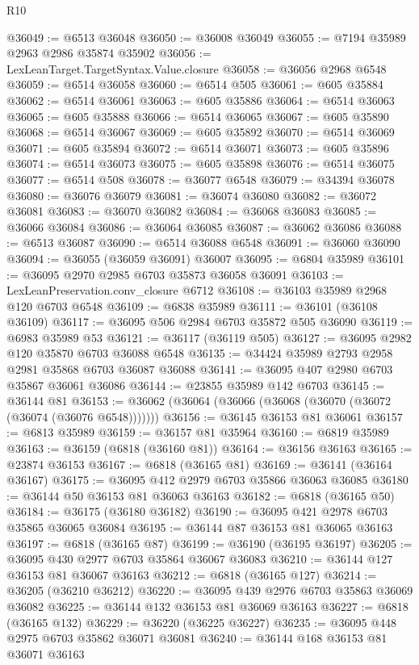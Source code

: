 \begin{lexlean}{R10}
\begin{coremodule}
@36049 := @6513 @36048
@36050 := @36008 @36049
@36055 := @7194 @35989 @2963 @2986 @35874 @35902
@36056 := LexLeanTarget.TargetSyntax.Value.closure
@36058 := @36056 @2968 @6548
@36059 := @6514 @36058
@36060 := @6514 @505
@36061 := @605 @35884
@36062 := @6514 @36061
@36063 := @605 @35886
@36064 := @6514 @36063
@36065 := @605 @35888
@36066 := @6514 @36065
@36067 := @605 @35890
@36068 := @6514 @36067
@36069 := @605 @35892
@36070 := @6514 @36069
@36071 := @605 @35894
@36072 := @6514 @36071
@36073 := @605 @35896
@36074 := @6514 @36073
@36075 := @605 @35898
@36076 := @6514 @36075
@36077 := @6514 @508
@36078 := @36077 @6548
@36079 := @34394 @36078
@36080 := @36076 @36079
@36081 := @36074 @36080
@36082 := @36072 @36081
@36083 := @36070 @36082
@36084 := @36068 @36083
@36085 := @36066 @36084
@36086 := @36064 @36085
@36087 := @36062 @36086
@36088 := @6513 @36087
@36090 := @6514 @36088 @6548
@36091 := @36060 @36090
@36094 := @36055 (@36059 @36091) @36007
@36095 := @6804 @35989
@36101 := @36095 @2970 @2985 @6703 @35873 @36058 @36091
@36103 := LexLeanPreservation.conv_closure @6712
@36108 := @36103 @35989 @2968 @120 @6703 @6548
@36109 := @6838 @35989
@36111 := @36101 (@36108 @36109)
@36117 := @36095 @506 @2984 @6703 @35872 @505 @36090
@36119 := @6983 @35989 @53
@36121 := @36117 (@36119 @505)
@36127 := @36095 @2982 @120 @35870 @6703 @36088 @6548
@36135 := @34424 @35989 @2793 @2958 @2981 @35868 @6703 @36087 @36088
@36141 := @36095 @407 @2980 @6703 @35867 @36061 @36086
@36144 := @23855 @35989 @142 @6703
@36145 := @36144 @81
@36153 := @36062 (@36064 (@36066 (@36068 (@36070 (@36072 (@36074 (@36076 @6548)))))))
@36156 := @36145 @36153 @81 @36061
@36157 := @6813 @35989
@36159 := @36157 @81 @35964
@36160 := @6819 @35989
@36163 := @36159 (@6818 (@36160 @81))
@36164 := @36156 @36163
@36165 := @23874 @36153
@36167 := @6818 (@36165 @81)
@36169 := @36141 (@36164 @36167)
@36175 := @36095 @412 @2979 @6703 @35866 @36063 @36085
@36180 := @36144 @50 @36153 @81 @36063 @36163
@36182 := @6818 (@36165 @50)
@36184 := @36175 (@36180 @36182)
@36190 := @36095 @421 @2978 @6703 @35865 @36065 @36084
@36195 := @36144 @87 @36153 @81 @36065 @36163
@36197 := @6818 (@36165 @87)
@36199 := @36190 (@36195 @36197)
@36205 := @36095 @430 @2977 @6703 @35864 @36067 @36083
@36210 := @36144 @127 @36153 @81 @36067 @36163
@36212 := @6818 (@36165 @127)
@36214 := @36205 (@36210 @36212)
@36220 := @36095 @439 @2976 @6703 @35863 @36069 @36082
@36225 := @36144 @132 @36153 @81 @36069 @36163
@36227 := @6818 (@36165 @132)
@36229 := @36220 (@36225 @36227)
@36235 := @36095 @448 @2975 @6703 @35862 @36071 @36081
@36240 := @36144 @168 @36153 @81 @36071 @36163

\end{coremodule}
\end{lexlean}
